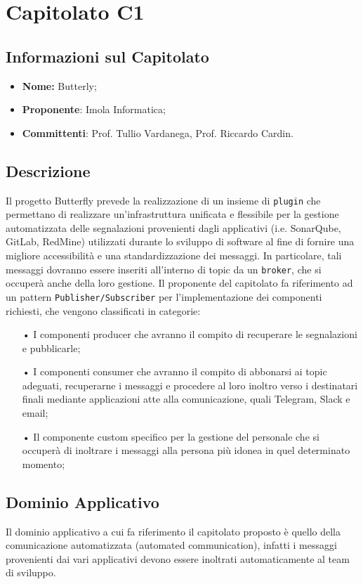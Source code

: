 \section{Capitolato C1}
\subsection{Informazioni sul Capitolato}
\begin{itemize}
	\item \textbf{Nome:} Butterly;
	\item \textbf{Proponente}: Imola Informatica;
	\item \textbf{Committenti}: Prof. Tullio Vardanega, Prof. Riccardo Cardin.
\end{itemize}

\subsection{Descrizione}
Il progetto Butterfly prevede la realizzazione di un insieme di \texttt{plugin} che permettano di realizzare un'infrastruttura unificata e flessibile per la gestione automatizzata delle segnalazioni provenienti dagli applicativi (i.e. SonarQube, GitLab, RedMine) utilizzati durante lo sviluppo di software al fine di fornire una migliore accessibilità e una standardizzazione dei messaggi. In particolare, tali messaggi dovranno essere inseriti all'interno di topic da un \texttt{broker}, che si occuperà anche della loro gestione. Il proponente del capitolato fa riferimento ad un pattern \texttt{Publisher/Subscriber} per l'implementazione dei componenti richiesti, che vengono classificati in categorie:
\begin{itemize}
\item[•]I componenti producer che avranno il compito di recuperare le segnalazioni e pubblicarle;
\item[•]I componenti consumer che avranno il compito di abbonarsi ai topic adeguati, recuperarne i messaggi e procedere al loro inoltro verso i destinatari finali mediante applicazioni atte alla comunicazione, quali Telegram, Slack e email;
\item[•]Il componente custom specifico per la gestione del personale che si occuperà di inoltrare i messaggi alla persona più idonea in quel determinato momento;
\end{itemize}
\subsection{Dominio Applicativo}
Il dominio applicativo a cui fa riferimento il capitolato proposto è quello della comunicazione automatizzata (automated communication), infatti i messaggi provenienti dai vari applicativi devono essere inoltrati automaticamente al team di sviluppo.
